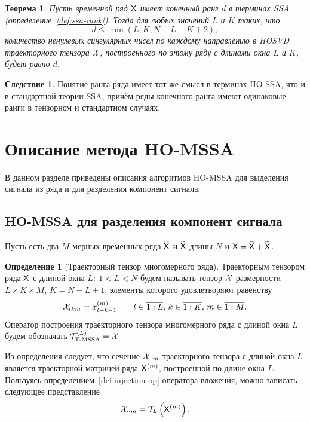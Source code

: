 \documentclass[specialist,
  substylefile=spbu_report.rtx,
subf,href,colorlinks=true, 12pt]{disser}
\theoremstyle{plain}
\newtheorem{theorem}{Теорема}
\theoremstyle{definition}
\newtheorem{definition}{Определение}[section]
\newtheorem*{corollary}{Следствие}
\theoremstyle{remark}
\begin{document}
\begin{theorem}
  \label{state:tens-ssa-rank}
  Пусть временной ряд $\mathsf{X}$ имеет конечный ранг $d$ в терминах
  \emph{SSA} (определение~\ref{def:ssa-rank}).
  Тогда для любых значений $L$ и $K$ таких, что
  \begin{equation}
    d\leqslant\min(L, K, N-L-K+2), \label{eq:tensor-admissability}
  \end{equation}
  количество ненулевых сингулярных чисел по каждому направлению в
  \emph{HOSVD} траекторного тензора $\mathcal{X}$,
  построенного по этому ряду с длинами окна $L$ и $K$, будет равно $d$.
\end{theorem}
\begin{corollary}
  Понятие ранга ряда имеет тот же смысл в терминах HO-SSA, что и в
  стандартной теории SSA, причём ряды
  конечного ранга имеют одинаковые ранги в тензорном и стандартном случаях.
\end{corollary}

\section{Описание метода HO-MSSA}
\label{sec:ho-mssa-desc}
В данном разделе приведены описания алгоритмов HO-MSSA для
выделения сигнала из ряда и для разделения компонент сигнала.

\subsection{HO-MSSA для разделения компонент сигнала}
\label{subsec:ho-mssa-desc-components}
Пусть есть два $M$-мерных временных ряда $\widehat{\mathsf{X}}$ и
$\widetilde{\mathsf{X}}$ длины $N$ и $\mathsf{X} = \widehat{\mathsf{X}} + \widetilde{\mathsf{X}}$.

\begin{definition}[Траекторный тензор многомерного ряда]
  \label{def:trajectory-tensor-mssa}
  Траекторным тензором ряда $\mathsf{X}$ с длиной окна $L:\: 1< L < N$ будем
  называть тензор $\mathcal{X}$
  размерности ${L \times K \times M}$, ${K = N - L + 1}$, элементы
  которого удовлетворяют равенству
  \[
    \mathcal{X}_{lkm}=x_{l+k-1}^{(m)} \qquad l \in \overline{1:L},\, k \in
    \overline{1:K},\, m \in \overline{1:M}.
  \]
  Оператор построения траекторного тензора многомерного ряда с длиной
  окна $L$ будем обозначать
  $\mathcal{T}_{\textrm{T-MSSA}}^{(L)} = \mathcal{X}$
\end{definition}
Из определения следует, что сечение $\mathcal{X}_{\cdot \cdot m}$
траекторного тензора с длиной окна $L$
является траекторной матрицей ряда $\mathsf{X}^{(m)}$, построенной по длине окна $L$.
Пользуясь определением~\ref{def:injection-op} оператора вложения,
можно записать следующее представление
\[
  \mathcal{X}_{\cdot \cdot m} = \mathcal{T}_L \left(\mathsf{X}^{(m)}\right).
\]
\end{document}

